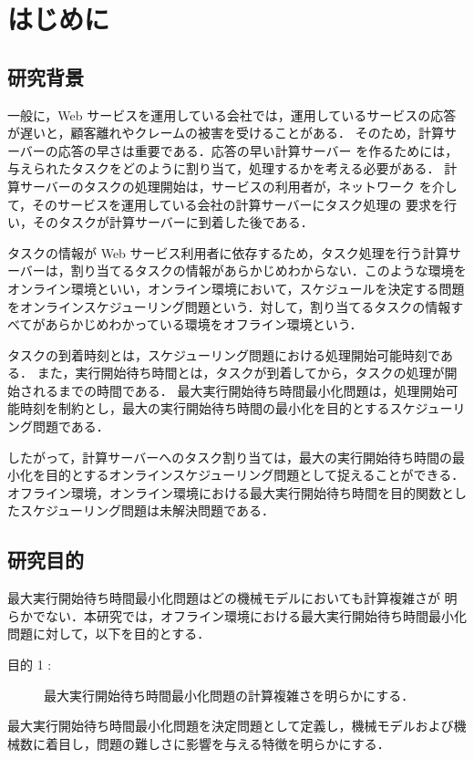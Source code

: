 \documentclass[12pt]{optlab-bachelor}
\begin{document}
\frontmatter

\chapter{はじめに}\label{c_1}
\section{研究背景}
一般に，Web サービスを運用している会社では，運用しているサービスの応答が遅いと，顧客離れやクレームの被害を受けることがある．
そのため，計算サーバーの応答の早さは重要である．応答の早い計算サーバー
を作るためには，与えられたタスクをどのように割り当て，処理するかを考える必要がある．
計算サーバーのタスクの処理開始は，サービスの利用者が，ネットワーク
を介して，そのサービスを運用している会社の計算サーバーにタスク処理の
要求を行い，そのタスクが計算サーバーに到着した後である．

タスクの情報が Web サービス利用者に依存するため，タスク処理を行う計算サーバーは，割り当てるタスクの情報があらかじめわからない．このような環境をオンライン環境といい，オンライン環境において，スケジュールを決定する問題をオンラインスケジューリング問題という．対して，割り当てるタスクの情報すべてがあらかじめわかっている環境をオフライン環境という．

タスクの到着時刻とは，スケジューリング問題における処理開始可能時刻である．
また，実行開始待ち時間とは，タスクが到着してから，タスクの処理が開始されるまでの時間である．
最大実行開始待ち時間最小化問題は，処理開始可能時刻を制約とし，最大の実行開始待ち時間の最小化を目的とするスケジューリング問題である．

したがって，計算サーバーへのタスク割り当ては，最大の実行開始待ち時間の最小化を目的とするオンラインスケジューリング問題として捉えることができる．
オフライン環境，オンライン環境における最大実行開始待ち時間を目的関数としたスケジューリング問題は未解決問題である．

\section{研究目的}
最大実行開始待ち時間最小化問題はどの機械モデルにおいても計算複雑さが
明らかでない．本研究では，オフライン環境における最大実行開始待ち時間最小化問題に対して，以下を目的とする．
\begin{description}
  \item[目的 1 :]
  最大実行開始待ち時間最小化問題の計算複雑さを明らかにする．
\end{description}

最大実行開始待ち時間最小化問題を決定問題として定義し，機械モデルおよび機械数に着目し，問題の難しさに影響を与える特徴を明らかにする．
\end{document}
